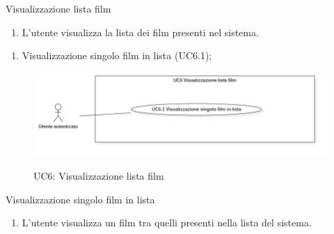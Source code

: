 \begin{usecase}{6}{Visualizzazione lista film}\label{uc:visualizzazione-lista-film}
  \usecasemain{}
  
  \begin{enumerate}
    \item L'utente visualizza la lista dei film presenti nel sistema.
  \end{enumerate}

  \begin{enumerate}
    \item Visualizzazione singolo film in lista (UC6.1);
  \end{enumerate}
\end{usecase}

\begin{figure}[!ht] 
  \centering 
  \includegraphics[width=0.9\columnwidth, alt={Caso d'uso relativo alla visualizzazione della lista dei film dell'utente}]{immagini/usecase/UC6.jpg}
  \caption{UC6: Visualizzazione lista film}\label{fig:uc:visualizzazione-lista-film}
\end{figure}

\begin{usecase}{6.1}{Visualizzazione singolo film in lista}\label{uc:visualizzazione-singolo-lista-film}
  \newpage
  \usecasemain{}
  
  \begin{enumerate}
    \item L'utente visualizza un film tra quelli presenti nella lista del sistema.
  \end{enumerate}
\end{usecase}

